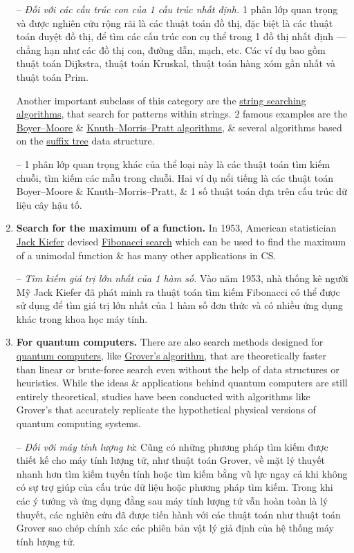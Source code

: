 \documentclass[oneside]{book}
\begin{document}
\begin{enumerate}
	-- {\it Đối với các cấu trúc con của 1 cấu trúc nhất định.} 1 phân lớp quan trọng và được nghiên cứu rộng rãi là các thuật toán đồ thị, đặc biệt là các thuật toán duyệt đồ thị, để tìm các cấu trúc con cụ thể trong 1 đồ thị nhất định — chẳng hạn như các đồ thị con, đường dẫn, mạch, etc. Các ví dụ bao gồm thuật toán Dijkstra, thuật toán Kruskal, thuật toán hàng xóm gần nhất và thuật toán Prim.
	
	Another important subclass of this category are the \href{https://en.wikipedia.org/wiki/String_searching_algorithm}{string searching algorithms}, that search for patterns within strings. 2 famous examples are the \href{https://en.wikipedia.org/wiki/Boyer%E2%80%93Moore_string-search_algorithm}{Boyer--Moore} \& \href{https://en.wikipedia.org/wiki/Knuth%E2%80%93Morris%E2%80%93Pratt_algorithm}{Knuth--Morris--Pratt algorithms}, \& several algorithms based on the \href{https://en.wikipedia.org/wiki/Suffix_tree}{suffix tree} data structure.
	
	-- 1 phân lớp quan trọng khác của thể loại này là các thuật toán tìm kiếm chuỗi, tìm kiếm các mẫu trong chuỗi. Hai ví dụ nổi tiếng là các thuật toán Boyer--Moore \& Knuth--Morris--Pratt, \& 1 số thuật toán dựa trên cấu trúc dữ liệu cây hậu tố.
	\item {\bf Search for the maximum of a function.} In 1953, American statistician \href{https://en.wikipedia.org/wiki/Jack_Kiefer_(statistician)}{\sc Jack Kiefer} devised \href{https://en.wikipedia.org/wiki/Fibonacci_search_technique}{Fibonacci search} which can be used to find the maximum of a unimodal function \& has many other applications in CS.
	
	-- {\it Tìm kiếm giá trị lớn nhất của 1 hàm số.} Vào năm 1953, nhà thống kê người Mỹ Jack Kiefer đã phát minh ra thuật toán tìm kiếm Fibonacci có thể được sử dụng để tìm giá trị lớn nhất của 1 hàm số đơn thức và có nhiều ứng dụng khác trong khoa học máy tính.
	\item {\bf For quantum computers.} There are also search methods designed for \href{https://en.wikipedia.org/wiki/Quantum_computing}{quantum computers}, like \href{https://en.wikipedia.org/wiki/Grover%27s_algorithm}{Grover's algorithm}, that are theoretically faster than linear or brute-force search even without the help of data structures or heuristics. While the ideas \& applications behind quantum computers are still entirely theoretical, studies have been conducted with algorithms like Grover's that accurately replicate the hypothetical physical versions of quantum computing systems.
	
	-- {\it Đối với máy tính lượng tử}: Cũng có những phương pháp tìm kiếm được thiết kế cho máy tính lượng tử, như thuật toán Grover, về mặt lý thuyết nhanh hơn tìm kiếm tuyến tính hoặc tìm kiếm bằng vũ lực ngay cả khi không có sự trợ giúp của cấu trúc dữ liệu hoặc phương pháp tìm kiếm. Trong khi các ý tưởng và ứng dụng đằng sau máy tính lượng tử vẫn hoàn toàn là lý thuyết, các nghiên cứu đã được tiến hành với các thuật toán như thuật toán Grover sao chép chính xác các phiên bản vật lý giả định của hệ thống máy tính lượng tử.
\end{enumerate}
\end{document}

